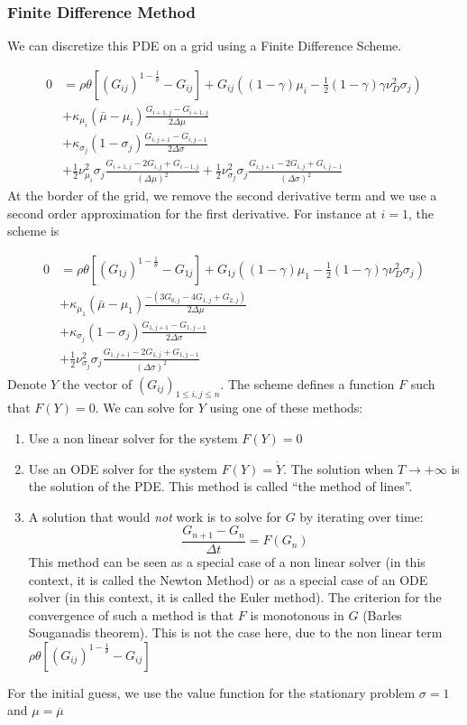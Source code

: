 \documentclass[english]{article}
\begin{document}
\subsubsection{Finite Difference Method}
We can discretize this PDE on a grid using a Finite Difference Scheme. 

\begin{align*}
	0&= \rho \theta[(G_{ij})^{1-\frac{1}{\theta}}- G_{ij}]+G_{ij}((1-\gamma)\mu_i-\frac{1}{2}(1-\gamma)\gamma\nu_D^2\sigma_j)\\
	&+\kappa_{\mu_i}(\bar{\mu}-\mu_i)\frac{G_{i+1, j}-G_{i+1, j}}{2\Delta \mu}\\
	&+\kappa_{\sigma_j}(1-\sigma_j)\frac{G_{i, j+1}-G_{i,j-1}}{2\Delta \sigma}\\
	&+\frac{1}{2}\nu_{\mu_i}^{2}\sigma_j\frac{G_{i+1, j} - 2 G_{i, j} + G_{i-1, j}}{(\Delta\mu)^2}+\frac{1}{2}\nu_{\sigma_j}^{2}\sigma_j\frac{G_{i, j+1} - 2 G_{i, j} + G_{i, j-1}}{(\Delta\sigma)^2}
\end{align*}
At the border of the grid, we remove the second derivative term and we use a second order approximation for the first derivative. For instance at $i = 1$, the scheme is 

\begin{align*}
	0&= \rho \theta[(G_{1j})^{1-\frac{1}{\theta}}- G_{1j}]+G_{1j}((1-\gamma)\mu_1-\frac{1}{2}(1-\gamma)\gamma\nu_D^2\sigma_j)\\
	&+\kappa_{\mu_1}(\bar{\mu}-\mu_1)\frac{-(3G_{0,j} - 4 G_{1,j} + G_{2,j})}{2\Delta \mu}\\
	&+\kappa_{\sigma_j}(1-\sigma_j)\frac{G_{1, j+1}-G_{1,j-1}}{2\Delta \sigma}\\
	&+\frac{1}{2}\nu_{\sigma_j}^{2}\sigma_j\frac{G_{1, j+1} - 2 G_{1, j} + G_{1, j-1}}{(\Delta\sigma)^2}
\end{align*}
Denote $Y$ the vector of  $(G_{ij})_{1 \leq i,j\leq n}$. The scheme  defines a function $F$ such that $F(Y) = 0$. We can solve for $Y$ using one of these methods:
\begin{enumerate}
	\item Use a non linear solver for the system $F(Y) = 0$
	\item Use an ODE solver for the system $F(Y) = \dot{Y}$. The solution when $T\rightarrow +\infty$ is the solution of the PDE. This method is called ``the method of lines''.
	\item A solution that would \textit{not} work is to solve for $G$ by iterating over time:
	$$\frac{G_{n+1}-G_n}{\Delta t} = F(G_n)$$
	This method can be seen as a special case of a non linear solver (in this context, it is called the Newton Method) or as a special case of an ODE solver (in this context, it is called the Euler method). The criterion for the convergence of such a method is that $F$ is monotonous in $G$ (Barles Souganadis theorem). This is not the case here, due to the non linear term  $\rho \theta[(G_{ij})^{1-\frac{1}{\theta}}- G_{ij}]$
\end{enumerate}
For the initial guess, we use the value function for the stationary problem $\sigma = 1$ and $\mu = \overline{\mu}$
\end{document}
